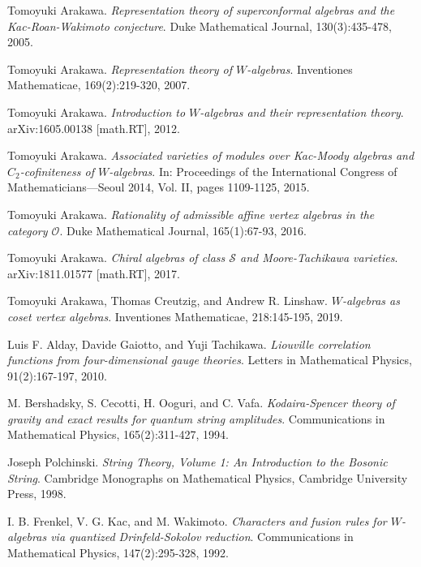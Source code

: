 \begin{thebibliography}{99}

Tomoyuki Arakawa.
\textit{Representation theory of superconformal algebras and the Kac-Roan-Wakimoto conjecture}.
Duke Mathematical Journal, 130(3):435-478, 2005.

Tomoyuki Arakawa.
\textit{Representation theory of $W$-algebras}.
Inventiones Mathematicae, 169(2):219-320, 2007.

Tomoyuki Arakawa.
\textit{Introduction to $W$-algebras and their representation theory}.
arXiv:1605.00138 [math.RT], 2012.

Tomoyuki Arakawa.
\textit{Associated varieties of modules over Kac-Moody algebras and $C_2$-cofiniteness of $W$-algebras}.
In: Proceedings of the International Congress of Mathematicians---Seoul 2014, Vol. II, pages 1109-1125, 2015.

Tomoyuki Arakawa.
\textit{Rationality of admissible affine vertex algebras in the category $\mathcal{O}$}.
Duke Mathematical Journal, 165(1):67-93, 2016.

Tomoyuki Arakawa.
\textit{Chiral algebras of class $\mathcal{S}$ and Moore-Tachikawa varieties}.
arXiv:1811.01577 [math.RT], 2017.

Tomoyuki Arakawa, Thomas Creutzig, and Andrew R. Linshaw.
\textit{$W$-algebras as coset vertex algebras}.
Inventiones Mathematicae, 218:145-195, 2019.

Luis F. Alday, Davide Gaiotto, and Yuji Tachikawa.
\textit{Liouville correlation functions from four-dimensional gauge theories}.
Letters in Mathematical Physics, 91(2):167-197, 2010.

M. Bershadsky, S. Cecotti, H. Ooguri, and C. Vafa.
\textit{Kodaira-Spencer theory of gravity and exact results for quantum string amplitudes}.
Communications in Mathematical Physics, 165(2):311-427, 1994.

Joseph Polchinski.
\textit{String Theory, Volume 1: An Introduction to the Bosonic String}.
Cambridge Monographs on Mathematical Physics, Cambridge University Press, 1998.

I. B. Frenkel, V. G. Kac, and M. Wakimoto.
\textit{Characters and fusion rules for $W$-algebras via quantized Drinfeld-Sokolov reduction}.
Communications in Mathematical Physics, 147(2):295-328, 1992.


\end{thebibliography}

